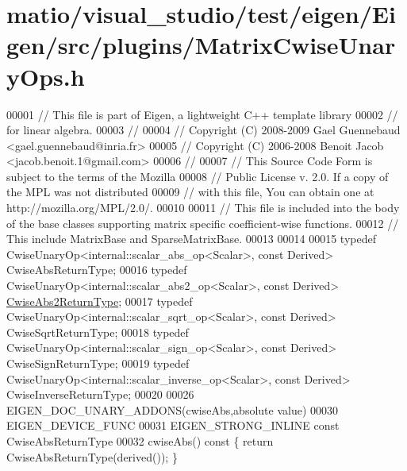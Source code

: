\hypertarget{matio_2visual__studio_2test_2eigen_2_eigen_2src_2plugins_2_matrix_cwise_unary_ops_8h_source}{}\section{matio/visual\+\_\+studio/test/eigen/\+Eigen/src/plugins/\+Matrix\+Cwise\+Unary\+Ops.h}
\label{matio_2visual__studio_2test_2eigen_2_eigen_2src_2plugins_2_matrix_cwise_unary_ops_8h_source}

\begin{DoxyCode}
00001 \textcolor{comment}{// This file is part of Eigen, a lightweight C++ template library}
00002 \textcolor{comment}{// for linear algebra.}
00003 \textcolor{comment}{//}
00004 \textcolor{comment}{// Copyright (C) 2008-2009 Gael Guennebaud <gael.guennebaud@inria.fr>}
00005 \textcolor{comment}{// Copyright (C) 2006-2008 Benoit Jacob <jacob.benoit.1@gmail.com>}
00006 \textcolor{comment}{//}
00007 \textcolor{comment}{// This Source Code Form is subject to the terms of the Mozilla}
00008 \textcolor{comment}{// Public License v. 2.0. If a copy of the MPL was not distributed}
00009 \textcolor{comment}{// with this file, You can obtain one at http://mozilla.org/MPL/2.0/.}
00010 
00011 \textcolor{comment}{// This file is included into the body of the base classes supporting matrix specific coefficient-wise
       functions.}
00012 \textcolor{comment}{// This include MatrixBase and SparseMatrixBase.}
00013 
00014 
00015 \textcolor{keyword}{typedef} CwiseUnaryOp<internal::scalar\_abs\_op<Scalar>, \textcolor{keyword}{const} Derived> CwiseAbsReturnType;
00016 \textcolor{keyword}{typedef} CwiseUnaryOp<internal::scalar\_abs2\_op<Scalar>, \textcolor{keyword}{const} Derived> 
      \hyperlink{group___core___module_class_eigen_1_1_cwise_unary_op}{CwiseAbs2ReturnType};
00017 \textcolor{keyword}{typedef} CwiseUnaryOp<internal::scalar\_sqrt\_op<Scalar>, \textcolor{keyword}{const} Derived> CwiseSqrtReturnType;
00018 \textcolor{keyword}{typedef} CwiseUnaryOp<internal::scalar\_sign\_op<Scalar>, \textcolor{keyword}{const} Derived> CwiseSignReturnType;
00019 \textcolor{keyword}{typedef} CwiseUnaryOp<internal::scalar\_inverse\_op<Scalar>, \textcolor{keyword}{const} Derived> CwiseInverseReturnType;
00020 
00026 EIGEN\_DOC\_UNARY\_ADDONS(cwiseAbs,absolute value)
00030 EIGEN\_DEVICE\_FUNC
00031 EIGEN\_STRONG\_INLINE \textcolor{keyword}{const} CwiseAbsReturnType
00032 cwiseAbs()\textcolor{keyword}{ const }\{ \textcolor{keywordflow}{return} CwiseAbsReturnType(derived()); \}

\end{DoxyCode}
